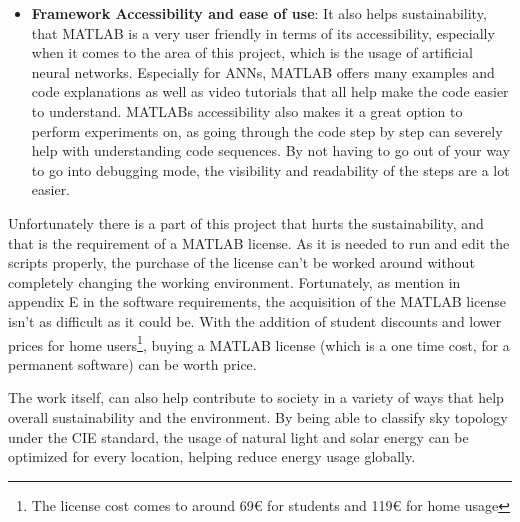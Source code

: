\begin{itemize}
    \item \textbf{Framework Accessibility and ease of use}: It also helps sustainability, that MATLAB is a very user friendly in terms of its accessibility, especially when it comes to the area of this project, which is the usage of artificial neural networks. Especially for ANNs, MATLAB offers many examples and code explanations as well as video tutorials that all help make the code easier to understand. MATLABs accessibility also makes it a great option to perform experiments on, as going through the code step by step can severely help with understanding code sequences. By not having to go out of your way to go into debugging mode, the visibility and readability of the steps are a lot easier.
\end{itemize}
Unfortunately there is a part of this project that hurts the sustainability, and that is the requirement of a MATLAB license. As it is needed to run and edit the scripts properly, the purchase of the license can't be worked around without completely changing the working environment. Fortunately, as mention in appendix E in the software requirements, the acquisition of the MATLAB license isn't as difficult as it could be. With the addition of student discounts and lower prices for home users\footnote{The license cost comes to around 69€ for students and 119€ for home usage}, buying a MATLAB license (which is a one time cost, for a permanent software) can be worth price.

The work itself, can also help contribute to society in a variety of ways that help overall sustainability and the environment. By being able to classify sky topology under the CIE standard, the usage of natural light and solar energy can be optimized for every location, helping reduce energy usage globally.
